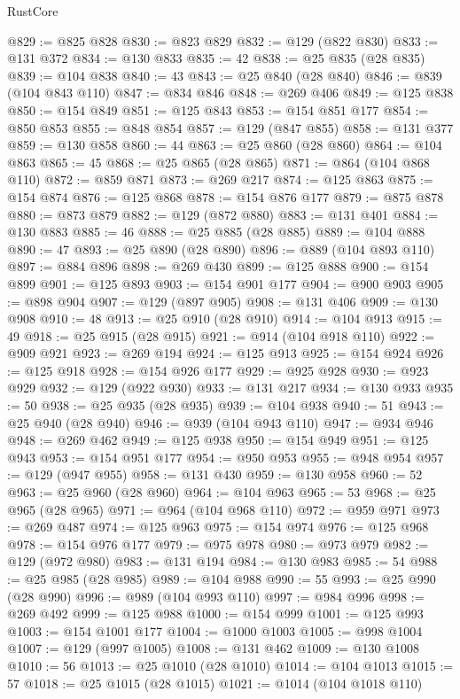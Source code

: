 \begin{lexlean}{RustCore}
\begin{coremodule}
@829 := @825 @828
@830 := @823 @829
@832 := @129 (@822 @830)
@833 := @131 @372
@834 := @130 @833
@835 := 42
@838 := @25 @835 (@28 @835)
@839 := @104 @838
@840 := 43
@843 := @25 @840 (@28 @840)
@846 := @839 (@104 @843 @110)
@847 := @834 @846
@848 := @269 @406
@849 := @125 @838
@850 := @154 @849
@851 := @125 @843
@853 := @154 @851 @177
@854 := @850 @853
@855 := @848 @854
@857 := @129 (@847 @855)
@858 := @131 @377
@859 := @130 @858
@860 := 44
@863 := @25 @860 (@28 @860)
@864 := @104 @863
@865 := 45
@868 := @25 @865 (@28 @865)
@871 := @864 (@104 @868 @110)
@872 := @859 @871
@873 := @269 @217
@874 := @125 @863
@875 := @154 @874
@876 := @125 @868
@878 := @154 @876 @177
@879 := @875 @878
@880 := @873 @879
@882 := @129 (@872 @880)
@883 := @131 @401
@884 := @130 @883
@885 := 46
@888 := @25 @885 (@28 @885)
@889 := @104 @888
@890 := 47
@893 := @25 @890 (@28 @890)
@896 := @889 (@104 @893 @110)
@897 := @884 @896
@898 := @269 @430
@899 := @125 @888
@900 := @154 @899
@901 := @125 @893
@903 := @154 @901 @177
@904 := @900 @903
@905 := @898 @904
@907 := @129 (@897 @905)
@908 := @131 @406
@909 := @130 @908
@910 := 48
@913 := @25 @910 (@28 @910)
@914 := @104 @913
@915 := 49
@918 := @25 @915 (@28 @915)
@921 := @914 (@104 @918 @110)
@922 := @909 @921
@923 := @269 @194
@924 := @125 @913
@925 := @154 @924
@926 := @125 @918
@928 := @154 @926 @177
@929 := @925 @928
@930 := @923 @929
@932 := @129 (@922 @930)
@933 := @131 @217
@934 := @130 @933
@935 := 50
@938 := @25 @935 (@28 @935)
@939 := @104 @938
@940 := 51
@943 := @25 @940 (@28 @940)
@946 := @939 (@104 @943 @110)
@947 := @934 @946
@948 := @269 @462
@949 := @125 @938
@950 := @154 @949
@951 := @125 @943
@953 := @154 @951 @177
@954 := @950 @953
@955 := @948 @954
@957 := @129 (@947 @955)
@958 := @131 @430
@959 := @130 @958
@960 := 52
@963 := @25 @960 (@28 @960)
@964 := @104 @963
@965 := 53
@968 := @25 @965 (@28 @965)
@971 := @964 (@104 @968 @110)
@972 := @959 @971
@973 := @269 @487
@974 := @125 @963
@975 := @154 @974
@976 := @125 @968
@978 := @154 @976 @177
@979 := @975 @978
@980 := @973 @979
@982 := @129 (@972 @980)
@983 := @131 @194
@984 := @130 @983
@985 := 54
@988 := @25 @985 (@28 @985)
@989 := @104 @988
@990 := 55
@993 := @25 @990 (@28 @990)
@996 := @989 (@104 @993 @110)
@997 := @984 @996
@998 := @269 @492
@999 := @125 @988
@1000 := @154 @999
@1001 := @125 @993
@1003 := @154 @1001 @177
@1004 := @1000 @1003
@1005 := @998 @1004
@1007 := @129 (@997 @1005)
@1008 := @131 @462
@1009 := @130 @1008
@1010 := 56
@1013 := @25 @1010 (@28 @1010)
@1014 := @104 @1013
@1015 := 57
@1018 := @25 @1015 (@28 @1015)
@1021 := @1014 (@104 @1018 @110)

\end{coremodule}
\end{lexlean}
